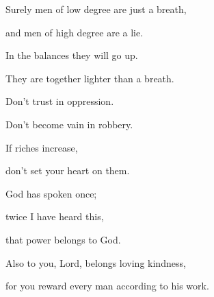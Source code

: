 {\Q {}Surely men of low degree are just a breath,
\par }{\QB and men of high degree are a lie.
\par }{\Q In the balances they will go up.
\par }{\QB They are together lighter than a breath.
\par }{\Q {}Don’t trust in oppression.
\par }{\QB Don’t become vain in robbery.
\par }{\Q If riches increase,
\par }{\QB don’t set your heart on them.
\par }{\Q {}God has spoken once;
\par }{\QB twice I have heard this,
\par }{\QB that power belongs to God.
\par }{\Q {}Also to you, Lord, belongs loving kindness,
\par }{\QB for you reward every man according to his work.

}
